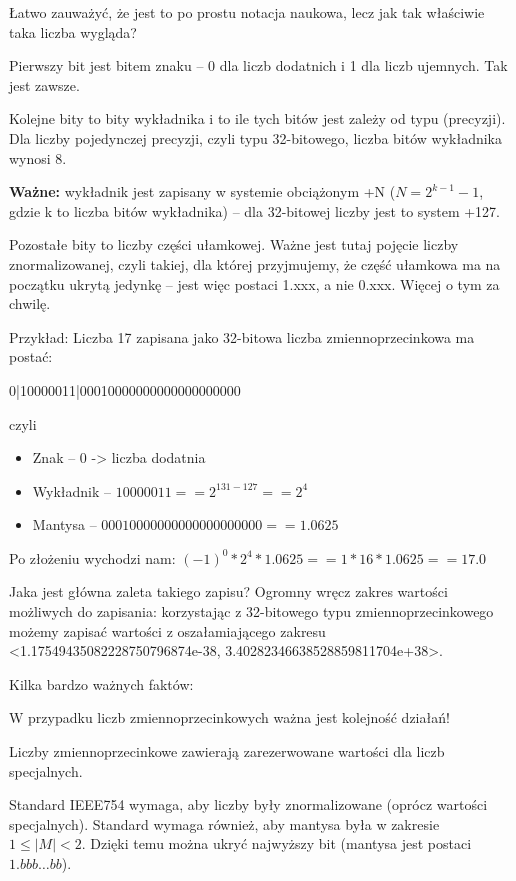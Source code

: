 Łatwo zauważyć, że jest to po prostu notacja naukowa, lecz jak tak właściwie taka liczba wygląda?

Pierwszy bit jest bitem znaku -- 0 dla liczb dodatnich i 1 dla liczb ujemnych. Tak jest zawsze.

Kolejne bity to bity wykładnika i to ile tych bitów jest zależy od typu (precyzji).
Dla liczby pojedynczej precyzji, czyli typu 32-bitowego, liczba bitów wykładnika wynosi 8.

\textbf{Ważne:} wykładnik jest zapisany w systemie obciążonym +N ($N = 2^{k-1}-1$, gdzie k to liczba bitów wykładnika) -- dla 32-bitowej liczby jest to system +127.

Pozostałe bity to liczby części ułamkowej.
Ważne jest tutaj pojęcie liczby znormalizowanej, czyli takiej, dla której przyjmujemy, że część ułamkowa ma na początku ukrytą jedynkę -- jest więc postaci 1.xxx, a nie 0.xxx.
Więcej o tym za chwilę.

Przykład:
Liczba 17 zapisana jako 32-bitowa liczba zmiennoprzecinkowa ma postać:

0|10000011|00010000000000000000000

czyli

\begin{itemize}
	\item{Znak -- 0 -> liczba dodatnia}
	\item{Wykładnik -- $10000011 == 2^{131 - 127} == 2^4$}
	\item{Mantysa -- $00010000000000000000000 == 1.0625$}
\end{itemize}

Po złożeniu wychodzi nam:
$(-1)^0 * 2^4 * 1.0625 == 1 * 16 * 1.0625 == 17.0$

Jaka jest główna zaleta takiego zapisu?
Ogromny wręcz zakres wartości możliwych do zapisania: korzystając z 32-bitowego typu zmiennoprzecinkowego możemy zapisać wartości z oszałamiającego zakresu <1.17549435082228750796874e-38, 3.40282346638528859811704e+38>.

Kilka bardzo ważnych faktów:

W przypadku liczb zmiennoprzecinkowych ważna jest kolejność działań!

Liczby zmiennoprzecinkowe zawierają zarezerwowane wartości dla liczb specjalnych.

Standard IEEE754 wymaga, aby liczby były znormalizowane (oprócz wartości specjalnych). Standard wymaga również, aby mantysa była w zakresie $1 \le |M| < 2$. Dzięki temu można ukryć najwyższy bit (mantysa jest postaci $1.bbb\ldots bb$).

